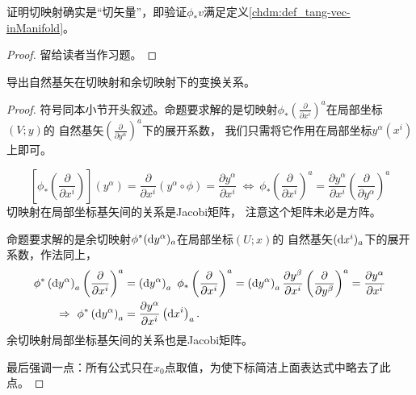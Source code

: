 \begin{proposition}
    证明切映射确实是“切矢量”，即验证$\phi_{*}v$满足定义\ref{chdm:def_tang-vec-inManifold}。
\end{proposition}
\begin{proof}
    留给读者当作习题。
\end{proof}

\begin{proposition}\label{chdm:thm_coortrans}
    导出自然基矢在切映射和余切映射下的变换关系。
\end{proposition}
\begin{proof}
符号同本小节开头叙述。命题要求解的是切映射$\phi_{*}(\frac{\partial}{\partial x^i})^a$在局部坐标$(V;y)$的
自然基矢$(\frac{\partial}{\partial y^\alpha})^a$下的展开系数，
我们只需将它作用在局部坐标$y^\alpha(x^i)$上即可。

\begin{equation}\label{chdm:eqn_push-bases}
    \left[\phi_{*}\left(\frac{\partial}{\partial x^i}\right)\right] (y^\alpha) 
    =\frac{\partial}{\partial x^i} \left(y^\alpha \circ \phi \right) 
    =\frac{\partial y^\alpha}{\partial x^i} 
    \ \Leftrightarrow\ \phi_{*}
    \left(\frac{\partial}{\partial x^i}\right)^a = \frac{\partial y^\alpha}{\partial x^i}
    \left(\frac{\partial}{\partial y^\alpha}\right)^a 
\end{equation}
切映射在局部坐标基矢间的关系是Jacobi矩阵，
注意这个矩阵未必是方阵。

命题要求解的是余切映射${\phi ^*}( {\rm{d}}{y^\alpha } )_a$在局部坐标$(U;x)$的
自然基矢$({\rm{d}}{x^i })_a$下的展开系数，作法同上，
\begin{align}
    {\phi ^*}\left( {{\rm{d}}{y^\alpha }} \right)_a 
    \left(\frac{\partial}{\partial x^i}\right) ^a 
    &= \left( {{\rm{d}}{y^\alpha }} \right)_a \ {\phi _*}
    \left(\frac{\partial}{\partial x^i}\right) ^a 
    = \left( {{\rm{d}}{y^\alpha }} \right)_a 
    \frac{\partial y^\beta}{\partial x^i}
    \left(\frac{\partial}{\partial y^\beta}\right)^a
    = \frac{{\partial {y^\alpha }}}{{\partial {x^i}}} \notag \\
    \Rightarrow \ 
    {\phi ^*}\left( {{\rm{d}}{y^\alpha }} \right)_a &=
     \frac{{\partial {y^\alpha }}}{{\partial {x^i}}} 
     \left( {{\rm{d}}{x^i }} \right)_a  . \label{chdm:eqn_pull-bases}
\end{align}
余切映射局部坐标基矢间的关系也是Jacobi矩阵。

最后强调一点：所有公式只在$x_0$点取值，为使下标简洁上面表达式中略去了此点。
\end{proof}

